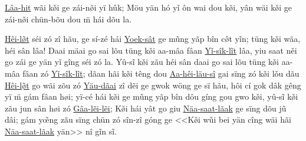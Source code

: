 \documentclass[twoside,twocolumn,a4paper,10pt]{memoir}
\begin{document}
\begin{scripture}
\begin{poetry}
			\underline{Lâa-hit} wãi k\v{\o{}}i ge zái-n\v{\o{}}i yï hûk;
			Möu yän hó y\v{i} ôn wai dou k\v{\o{}}i, yân wäi k\v{\o{}}i ge zái-n\v{\o{}}i chün-bõu dou \"{m} hái dõu la.
		\end{poetry}
		
		\underline{Hêi-l\~{\o{}}t} séi zó zî hãu,  ge sí-zé hái \underline{Yoek-sât} ge mũng yãp bîn c\^{\o{}}t yĩn; 
		tüng k\v{\o{}}i wãa, héi sân lâa! Daai mäai go sai lõu tüng k\v{\o{}}i aa-mâa fâan \underline{Y\v{i}-sîk-lĩt} lâa, yiu saat n\v{e}i go zái ge yän y\v{i} gîng séi zó la.
		Yû-sĩ k\v{\o{}}i zãu héi sân daai go sai lõu tüng k\v{\o{}}i aa-mâa fâan zó \underline{Y\v{i}-sîk-lĩt};
		dãan hãi k\v{\o{}}i têng dou \underline{Aa-hêi-läu-sî} gai sïng zó k\v{\o{}}i l\v{o}u dãu \underline{Hêi-l\~{\o{}}t} go wãi zõu zó \underline{Yäu-dãai} zî dẽi ge gwok wöng ge sï hãu, hôi cí gok dâk gêng yï \"{m} gám fâan h\o{}i; yï-cé  hái k\v{\o{}}i ge mũng yãp bîn dôu gíng gou gwo k\v{\o{}}i, yû-sĩ k\v{\o{}}i zãu jun sân h\o{}i zó \underline{Gâa-lẽi-lẽi};
		K\v{\o{}}i hái yât go giu \underline{Näa-saat-lãak} ge sïng dõu jũ dâi; gám y\~{œ}ng zãu sïng chün zó sîn-zî góng ge <<K\v{\o{}}i wũi bei yän cîng wäi hãi \underline{Näa-saat-lãak} yän>> nî gĩn sĩ.
		
		
		
		
	\end{scripture}
\end{document}
